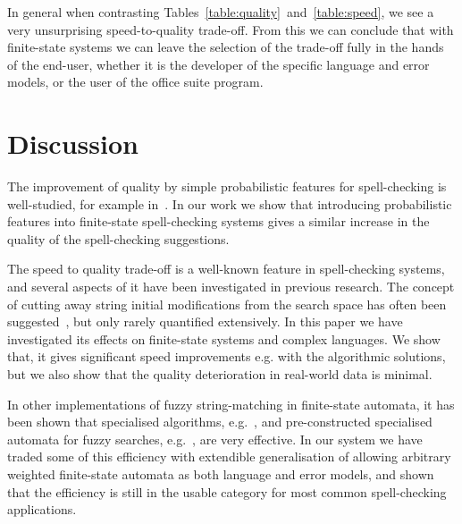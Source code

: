 \documentclass[a4paper,12pt]{article}
\begin{document}
In general when contrasting
Tables~\ref{table:quality}~and~\ref{table:speed}, we see a very unsurprising
speed-to-quality trade-off. From this we can conclude that with finite-state
systems we can leave the selection of the trade-off fully in the hands of
the end-user, whether it is the developer of the specific language and error
models, or the user of the office suite program.

%

\section{Discussion}
\label{sec:discussion}

The improvement of quality by simple probabilistic features for spell-checking
is well-studied, for example in~\cite{church1991probability}. In our work we
show that introducing probabilistic features into finite-state spell-checking
systems gives a similar increase in the quality of the spell-checking
suggestions.

The speed to quality trade-off is a well-known feature in spell-checking
systems, and several aspects of it have been investigated in previous research.
The concept of cutting away string initial modifications from the search space
has often been suggested~\cite{kukich1992techniques}, but only rarely
quantified extensively. In this paper we have investigated its effects on
finite-state systems and complex languages. We show that, it gives significant
speed improvements e.g. with the algorithmic solutions, but we also show that
the quality deterioration in real-world data is minimal.

In other implementations of fuzzy string-matching in finite-state automata, it
has been shown that specialised algorithms, e.g.~\cite{oflazer/1996}, and
pre-constructed specialised automata for fuzzy searches,
e.g.~\cite{hulden/2009}, are very effective. In our system we have traded some
of this efficiency with extendible generalisation of allowing arbitrary
weighted finite-state automata as both language and error models, and shown
that the efficiency is still in the usable category for most common
spell-checking applications.
\end{document}
